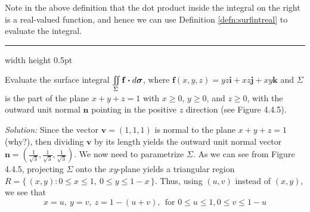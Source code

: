Note in the above definition that the dot product inside the integral on the right is a
real-valued function, and hence we can use Definition \ref{defn:surfintreal} to evaluate the integral.

\medskip
\hrule width \textwidth height 0.5pt
\begin{exmp}\label{exmp:surfintex}
 Evaluate the surface integral $\iint\limits_{\Sigma} \mathbf{f} \bm{\cdot} d\bm{\sigma}$, where
 $\mathbf{f}(x,y,z) = yz\mathbf{i} + xz\mathbf{j} + xy\mathbf{k}$ and $\Sigma$ is the part of the plane $x+y+z=1$
 with $x \ge 0$, $y \ge 0$, and $z \ge 0$, with the outward unit normal $\mathbf{n}$ pointing in the positive $z$
 direction (see Figure 4.4.5).\smallskip
 \piccaption[]{}
 \par\noindent \emph{Solution:} Since the vector $\mathbf{v} = (1,1,1)$ is normal to the plane $x+y+z=1$ (why?), then
 dividing $\mathbf{v}$ by its length yields the outward unit normal vector $\mathbf{n} = \left( \frac{1}{\sqrt{3}},
 \frac{1}{\sqrt{3}},\frac{1}{\sqrt{3}} \right)$. We now need to parametrize $\Sigma$. As we can see from Figure 4.4.5,
 projecting $\Sigma$ onto the $xy$-plane yields a triangular region
 $R= \lbrace\,(x,y): 0 \le x \le 1,~ 0 \le y \le 1-x\,\rbrace$. Thus, using $(u,v)$ instead of $(x,y)$, we see that
 \begin{displaymath}
  x=u,~ y=v,~ z=1-(u+v),~~\text{for~} 0 \le u \le 1, 0 \le v \le 1-u
 \end{displaymath}

\end{exmp}
